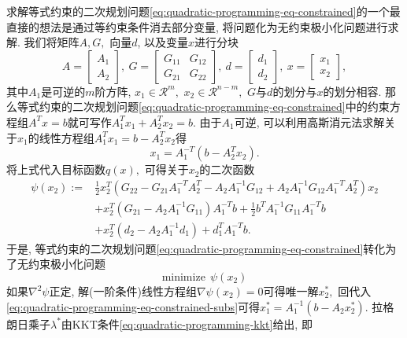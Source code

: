 \documentclass{SBCbookchapter}
\newcommand{\R}{\mathcal{R}}
\begin{document}
求解等式约束的二次规划问题\eqref{eq:quadratic-programming-eq-constrained}的一个最直接的想法是通过等约束条件消去部分变量, 将问题化为无约束极小化问题进行求解. 我们将矩阵$A, G,$ 向量$d$, 以及变量$x$进行分块
\begin{equation*}
A = \begin{bmatrix} A_1 \\ A_2 \end{bmatrix}, ~ G = \begin{bmatrix} G_{11} & G_{12} \\ G_{21} & G_{22} \end{bmatrix}, ~ d = \begin{bmatrix} d_1 \\ d_2 \end{bmatrix}, ~ x = \begin{bmatrix} x_1 \\ x_2 \end{bmatrix},
\end{equation*}
其中$A_1$是可逆的$m$阶方阵, $x_1 \in \R^{m},$ $x_2 \in \R^{n-m},$ $G$与$d$的划分与$x$的划分相容. 那么等式约束的二次规划问题\eqref{eq:quadratic-programming-eq-constrained}中的约束方程组$A^T x = b$就可写作$A_1^T x_1 + A_2^T x_2 = b.$ 由于$A_1$可逆, 可以利用高斯消元法求解关于$x_1$的线性方程组$A_1^Tx_1 = b - A_2^Tx_2$得
\begin{equation}
\label{eq:quadratic-programming-eq-constrained-subs}
x_1 = A_1^{-T} (b - A_2^Tx_2).
\end{equation}
将上式代入目标函数$q(x),$ 可得关于$x_2$的二次函数
\begin{equation}
\begin{aligned}
\psi (x_2) := & \frac{1}{2} x_2^T \left( G_{22} - G_{21} A_1^{-T} A_2^T - A_2 A_1^{-1} G_{12} + A_2 A_1^{-1} G_{12} A_1^{-T} A_2^T \right) x_2 \\
& + x_2^T \left( G_{21} - A_2 A_1^{-1} G_{11} \right) A_1^{-T} b + \frac{1}{2} b^T A_1^{-1} G_{11} A_1^{-T} b \\
& + x_2^T \left( d_2 - A_2 A_1^{-1} d_1 \right) + d_1^T A_1^{-T} b.
\end{aligned}
\end{equation}
于是, 等式约束的二次规划问题\eqref{eq:quadratic-programming-eq-constrained}转化为了无约束极小化问题
\begin{equation*}
\text{minimize} ~~ \psi(x_2)
\end{equation*}
如果$\nabla^2 \psi$正定, 解(一阶条件)线性方程组$\nabla \psi (x_2) = 0$可得唯一解$x_2^*,$ 回代入\eqref{eq:quadratic-programming-eq-constrained-subs}可得$x_1^* = A_1^{-1} (b - A_2x_2^*).$ 拉格朗日乘子$\lambda^*$由KKT条件\eqref{eq:quadratic-programming-kkt}给出, 即
\end{document}
